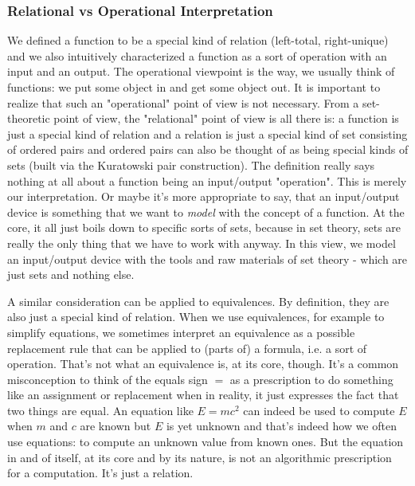 

\subsubsection{Relational vs Operational Interpretation}
We defined a function to be a special kind of relation (left-total, right-unique) and we also intuitively characterized a function as a sort of operation with an input and an output. The operational viewpoint is the way, we usually think of functions: we put some object in and get some object out. It is important to realize that such an "operational" point of view is not necessary. From a set-theoretic point of view, the "relational" point of view is all there is: a function is just a special kind of relation and a relation is just a special kind of set consisting of ordered pairs and ordered pairs can also be thought of as being special kinds of sets (built via the Kuratowski pair construction). The definition really says nothing at all about a function being an input/output "operation". This is merely our interpretation. Or maybe it's more appropriate to say, that an input/output device is something that we want to \emph{model} with the concept of a function. At the core, it all just boils down to specific sorts of sets, because in set theory, sets are really the only thing that we have to work with anyway. In this view, we model an input/output device with the tools and raw materials of set theory - which are just sets and nothing else.

\medskip
A similar consideration can be applied to equivalences. By definition, they are also just a special kind of relation. When we use equivalences, for example to simplify equations, we sometimes interpret an equivalence as a possible replacement rule that can be applied to (parts of) a formula, i.e. a sort of operation. That's not what an equivalence is, at its core, though. It's a common misconception to think of the equals sign $=$ as a prescription to do something like an assignment or replacement when in reality, it just expresses the fact that two things are equal. An equation like $E = m c^2$ can indeed be used to compute $E$ when $m$ and $c$ are known but $E$ is yet unknown and that's indeed how we often use equations: to compute an unknown value from known ones. But the equation in and of itself, at its core and by its nature, is not an algorithmic prescription for a computation. It's just a relation.


